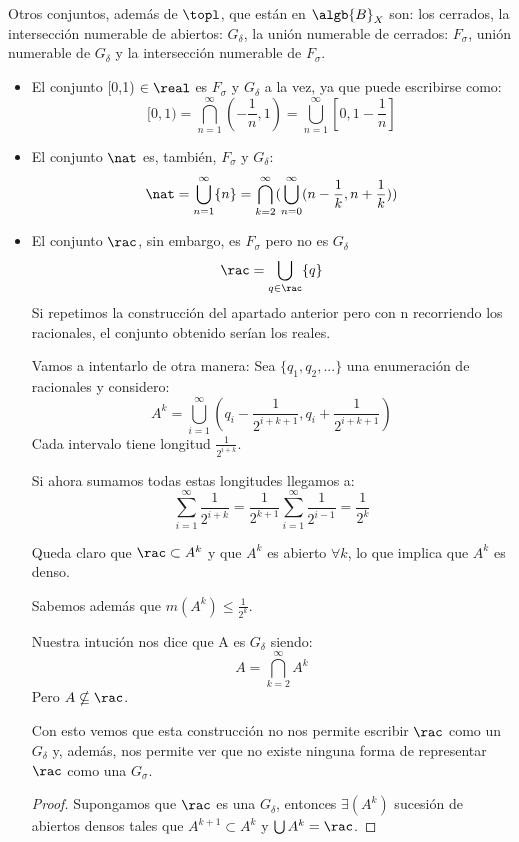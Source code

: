 \documentclass{apuntes}
\begin{document}
\obs Otros conjuntos, además de $\topl$, que están en $\algb{B}_X$ son: los cerrados, la intersección numerable de abiertos: $G_\delta$, la unión numerable de cerrados: $F_\sigma$, unión numerable de $G_\delta$ y la intersección numerable de $F_\sigma$.

\begin{example}
\begin{itemize}
\item El conjunto [0,1) $\in \real$ es $F_\sigma$ y $G_\delta$ a la vez, ya que puede escribirse como:
\[[0,1) = \bigcap_{n=1}^{\infty}(-\frac{1}{n}, 1) = \bigcup_{n=1}^{\infty}[0, 1-\frac{1}{n}]\]

\item El conjunto $\nat$ es, también, $F_\sigma$ y $G_\delta$:
\[\nat = \bigcup_{n=1}^{\infty}\{n\} = \bigcap_{k=2}^{\infty}(\bigcup_{n=0}^{\infty}(n-\frac{1}{k}, n+ \frac{1}{k}))\]

\item El conjunto $\rac$, sin embargo, es $F_\sigma$ pero no es $G_\delta$
\[\rac = \bigcup_{q \in \rac}\{q\} \]
Si repetimos la construcción del apartado anterior pero con n recorriendo los racionales, el conjunto obtenido serían los reales.

Vamos a intentarlo de otra manera:
Sea $\{q_1, q_2, ...\}$ una enumeración de racionales y considero:
\[A^k=\bigcup_{i=1}^{\infty}(q_i-\frac{1}{2^{i+k+1}}, q_i+\frac{1}{2^{i+k+1}})\]
Cada intervalo tiene longitud $\frac{1}{2^{i+k}}$.

Si ahora sumamos todas estas longitudes llegamos a:
\[\sum_{i=1}^{\infty}\frac{1}{2^{i+k}} = \frac{1}{2^{k+1}}\sum_{i=1}^{\infty}\frac{1}{2^{i-1}}=\frac{1}{2^k}\]

Queda claro que $\rac \subset A^k$ y que $A^k$ es abierto $\forall k$, lo que implica que $A^k$ es denso.

Sabemos además que $m(A^k)\leq \frac{1}{2^k}$.

Nuestra intución nos dice que A es $G_\delta$ siendo:
\[A= \bigcap_{k=2}^{\infty}A^k\]
Pero $A \nsubseteq \rac$.

Con esto vemos que esta construcción no nos permite escribir $\rac$ como un $G_\delta$ y, además, nos permite ver que no existe ninguna forma de representar $\rac$ como una $G_\sigma$.

\begin{proof}
Supongamos que $\rac$ es una $G_\delta$, entonces $\exists(A^k)$ sucesión de abiertos densos tales que $A^{k+1} \subset A^k$ y $\bigcup A^k=\rac$.


\end{proof}
\end{itemize}
\end{example}
\end{document}
